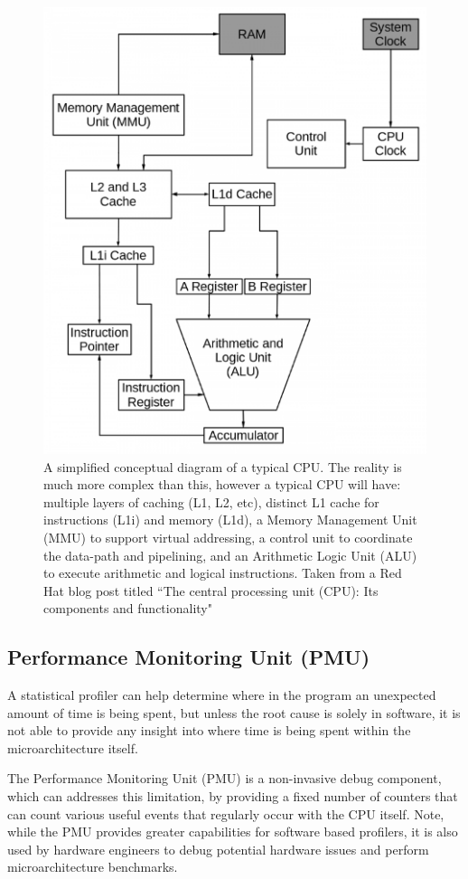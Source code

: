 {\begin{figure}[ht!]
    \centering
    \includegraphics[width=0.5\linewidth]{redhat_cpu_vis}
    \caption{A simplified conceptual diagram of a typical CPU. The reality is much more complex than this, however a typical CPU will have: multiple layers of caching (L1, L2, etc), distinct L1 cache for instructions (L1i) and memory (L1d), a Memory Management Unit (MMU) to support virtual addressing, a control unit to coordinate the data-path and pipelining, and an Arithmetic Logic Unit (ALU) to execute arithmetic and logical instructions. Taken from a Red Hat blog post titled ``The central processing unit (CPU): Its components and functionality" \cite{BlogRedHatCPU} } 
    \label{fig:cpu_vis}
\end{figure}

\subsection{Performance Monitoring Unit (PMU)}\label{sect:pmu}

A statistical profiler can help determine where in the program an unexpected amount of time is being spent, but unless the root cause is solely in software, it is not able to provide any insight into where time is being spent within the microarchitecture itself.

The Performance Monitoring Unit (PMU) is a non-invasive debug component, which can addresses this limitation, by providing a fixed number of counters that can count various useful events that regularly occur with the CPU itself. Note, while the PMU provides greater capabilities for software based profilers, it is also used by hardware engineers to debug potential hardware issues and perform microarchitecture benchmarks.

}
